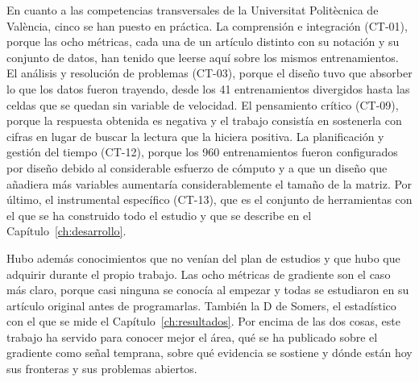 En cuanto a las competencias transversales de la Universitat Politècnica de València, cinco se han puesto en práctica. La comprensión e integración (CT-01), porque las ocho métricas, cada una de un artículo distinto con su notación y su conjunto de datos, han tenido que leerse aquí sobre los mismos entrenamientos. El análisis y resolución de problemas (CT-03), porque el diseño tuvo que absorber lo que los datos fueron trayendo, desde los 41 entrenamientos divergidos hasta las celdas que se quedan sin variable de velocidad. El pensamiento crítico (CT-09), porque la respuesta obtenida es negativa y el trabajo consistía en sostenerla con cifras en lugar de buscar la lectura que la hiciera positiva. La planificación y gestión del tiempo (CT-12), porque los 960 entrenamientos fueron configurados por diseño debido al considerable esfuerzo de cómputo y a que un diseño que añadiera más variables aumentaría considerablemente el tamaño de la matriz. Por último, el instrumental específico (CT-13), que es el conjunto de herramientas con el que se ha construido todo el estudio y que se describe en el Capítulo~\ref{ch:desarrollo}.

Hubo además conocimientos que no venían del plan de estudios y que hubo que adquirir durante el propio trabajo. Las ocho métricas de gradiente son el caso más claro, porque casi ninguna se conocía al empezar y todas se estudiaron en su artículo original antes de programarlas. También la D de Somers, el estadístico con el que se mide el Capítulo~\ref{ch:resultados}. Por encima de las dos cosas, este trabajo ha servido para conocer mejor el área, qué se ha publicado sobre el gradiente como señal temprana, sobre qué evidencia se sostiene y dónde están hoy sus fronteras y sus problemas abiertos.
